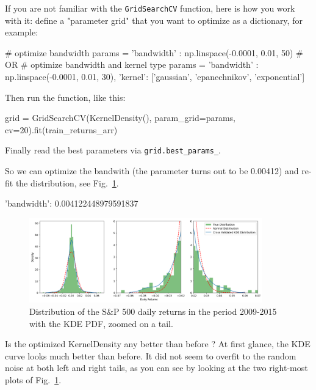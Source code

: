 \begin{finmarkets}
If you are not familiar with the \texttt{GridSearchCV} function, here is how you work with it: define a "parameter grid" that you want to optimize as a dictionary, for example:

\begin{ipythonbox}
# optimize bandwidth
params = {'bandwidth' : np.linspace(-0.0001, 0.01, 50)}    
                                                           # OR
# optimize bandwidth and kernel type
params = {
    'bandwidth' : np.linspace(-0.0001, 0.01, 30),
    'kernel': ['gaussian', 'epanechnikov', 'exponential']
         }
\end{ipythonbox}
Then run the function, like this:
\begin{ipythonbox}
grid = GridSearchCV(KernelDensity(), 
                    param_grid=params, 
                    cv=20).fit(train_returns_arr)
\end{ipythonbox}                    
Finally read the best parameters via \texttt{grid.best\_params\_}.
\end{finmarkets}

So we can optimize the bandwith (the parameter turns out to be 0.00412) and re-fit the distribution, see Fig.~\ref{fig:kde_opt_band}. 

\begin{ioutput}
{'bandwidth': 0.004122448979591837}
\end{ioutput}

\begin{figure}[htb]
\centering
\includegraphics[width=0.9\textwidth]{figures/kde_opt_band}
\caption{Distribution of the S\&P 500 daily returns in the period 2009-2015 with the KDE PDF, zoomed on a tail.}
\label{fig:kde_opt_band}
\end{figure}

Is the optimized KernelDensity any better than before ?
At first glance, the KDE curve looks much better than before. It did not seem to overfit to the random noise at both left and right tails, as you can see by looking at the two right-most plots of Fig.~\ref{fig:kde_opt_band}.

